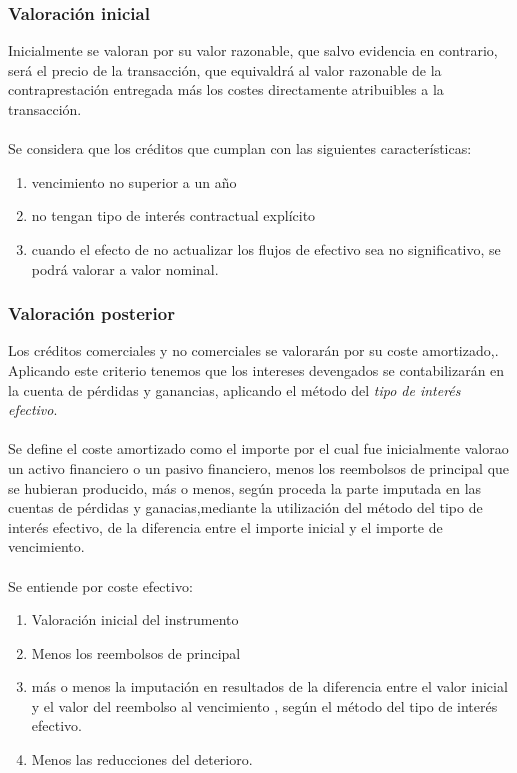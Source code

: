 \documentclass[a4paper,12pt]{article}
\begin{document}
\subsubsection{Valoración inicial}

Inicialmente se valoran por su valor razonable, que salvo evidencia en contrario, será el precio de la transacción, que equivaldrá al valor razonable de la contraprestación entregada más los costes directamente atribuibles a la transacción.\\\\
Se considera que los créditos que cumplan con las siguientes características:
\begin{enumerate}
    \item vencimiento no superior a un año
    \item no tengan tipo de interés contractual explícito
    \item cuando el efecto de no actualizar los flujos de efectivo sea no significativo, se podrá valorar a valor nominal.
\end{enumerate}

\subsubsection{Valoración posterior}

Los créditos comerciales y no comerciales se valorarán por su coste amortizado,. Aplicando este criterio tenemos que los intereses devengados se contabilizarán en la cuenta de pérdidas y ganancias, aplicando el método del \textit{tipo de interés efectivo}.\\\\
Se define el coste amortizado como el importe por el cual fue inicialmente valorao un activo financiero o un pasivo financiero, menos los reembolsos de principal que se hubieran producido, más o menos, según proceda la parte imputada en las cuentas de pérdidas y ganacias,mediante la utilización del método del tipo de interés efectivo, de la diferencia entre el importe inicial y el importe de vencimiento.\\\\
Se entiende por coste efectivo:
\begin{enumerate}
    \item Valoración inicial del instrumento
    \item Menos los reembolsos de principal
    \item más o menos la imputación en resultados de la diferencia entre el valor inicial y el valor del reembolso al vencimiento , según el método del tipo de interés efectivo.
    \item Menos las reducciones del deterioro.
\end{enumerate}
\end{document}
